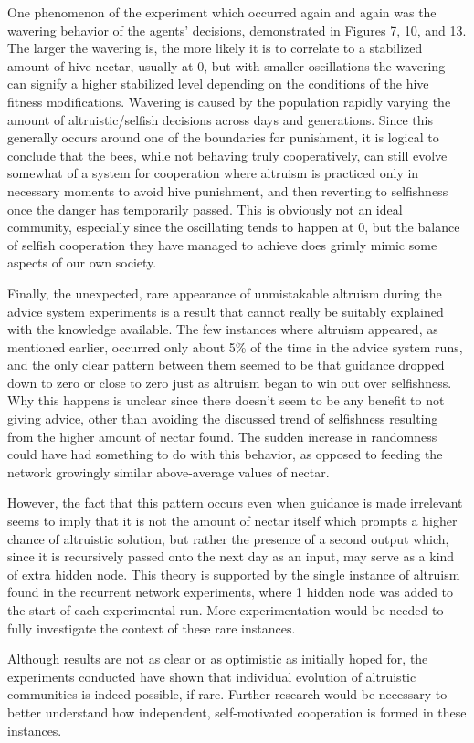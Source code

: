\documentclass[twoside]{article}
\begin{document}
\begin{multicols}{2}
        One phenomenon of the experiment which occurred again and again was the wavering behavior of the agents' decisions, demonstrated in Figures 7, 10, and 13. The larger the wavering is, the more likely it is to correlate to a stabilized amount of hive nectar, usually at 0, but with smaller oscillations the wavering can signify a higher stabilized level depending on the conditions of the hive fitness modifications. Wavering is caused by the population rapidly varying the amount of altruistic/selfish decisions across days and generations. Since this generally occurs around one of the boundaries for punishment, it is logical to conclude that the bees, while not behaving truly cooperatively, can still evolve somewhat of a system for cooperation where altruism is practiced only in necessary moments to avoid hive punishment, and then reverting to selfishness once the danger has temporarily passed. This is obviously not an ideal community, especially since the oscillating tends to happen at 0, but the balance of selfish cooperation they have managed to achieve does grimly mimic some aspects of our own society.

        Finally, the unexpected, rare appearance of unmistakable altruism during the advice system experiments is a result that cannot really be suitably explained with the knowledge available. The few instances where altruism appeared, as mentioned earlier, occurred only about 5\% of the time in the advice system runs, and the only clear pattern between them seemed to be that guidance dropped down to zero or close to zero just as altruism began to win out over selfishness. Why this happens is unclear since there doesn't seem to be any benefit to not giving advice, other than avoiding the discussed trend of selfishness resulting from the higher amount of nectar found. The sudden increase in randomness could have had something to do with this behavior, as opposed to feeding the network growingly similar above-average values of nectar.
        
        However, the fact that this pattern occurs even when guidance is made irrelevant seems to imply that it is not the amount of nectar itself which prompts a higher chance of altruistic solution, but rather the presence of a second output which, since it is recursively passed onto the next day as an input, may serve as a kind of extra hidden node. This theory is supported by the single instance of altruism found in the recurrent network experiments, where 1 hidden node was added to the start of each experimental run. More experimentation would be needed to fully investigate the context of these rare instances.

        Although results are not as clear or as optimistic as initially hoped for, the experiments conducted have shown that individual evolution of altruistic communities is indeed possible, if rare. Further research would be necessary to better understand how independent, self-motivated cooperation is formed in these instances.


	
	
\end{multicols}
\end{document}
